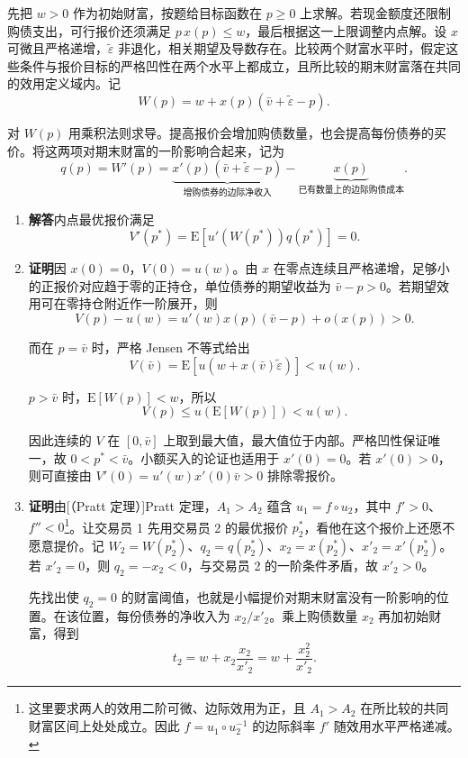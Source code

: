 \begin{solution}[blank-type=manual,blank-vsep=12\baselineskip]
先把 $w>0$ 作为初始财富，按题给目标函数在 $p\ge0$ 上求解。若现金额度还限制购债支出，可行报价还须满足 $p\,x(p)\le w$，最后根据这一上限调整内点解。设 $x$ 可微且严格递增，$\tilde\varepsilon$ 非退化，相关期望及导数存在。比较两个财富水平时，假定这些条件与报价目标的严格凹性在两个水平上都成立，且所比较的期末财富落在共同的效用定义域内。记
\[
 W(p)=w+x(p)(\bar v+\tilde\varepsilon-p).
\]

对 $W(p)$ 用乘积法则求导。提高报价会增加购债数量，也会提高每份债券的买价。将这两项对期末财富的一阶影响合起来，记为
\[
 q(p)=W'(p)
 =\underbrace{x'(p)(\bar v+\tilde\varepsilon-p)}_{\text{增购债券的边际净收入}}
 -\underbrace{x(p)}_{\text{已有数量上的边际购债成本}}.
\]

\begin{enumerate}[label=(\alph*)]
\item \textbf{解答}\quad 内点最优报价满足
\[
 V'(p^*)=\mathrm E[u'(W(p^*))q(p^*)]=0.
\]

\item \textbf{证明}\quad 因 $x(0)=0$，$V(0)=u(w)$。由 $x$ 在零点连续且严格递增，足够小的正报价对应趋于零的正持仓，单位债券的期望收益为 $\bar v-p>0$。若期望效用可在零持仓附近作一阶展开，则
\[
 V(p)-u(w)=u'(w)x(p)(\bar v-p)+o(x(p))>0.
\]

而在 $p=\bar v$ 时，严格 Jensen 不等式给出
\[
 V(\bar v)=\mathrm E[u(w+x(\bar v)\tilde\varepsilon)]<u(w).
\]

$p>\bar v$ 时，$\mathrm E[W(p)]<w$，所以
\[
 V(p)\le u(\mathrm E[W(p)])<u(w).
\]

因此连续的 $V$ 在 $[0,\bar v]$ 上取到最大值，最大值位于内部。严格凹性保证唯一，故 $0<p^*<\bar v$。小额买入的论证也适用于 $x'(0)=0$。若 $x'(0)>0$，则可直接由 $V'(0)=u'(w)x'(0)\bar v>0$ 排除零报价。

\item \textbf{证明}\quad 由\ifdefined\WJHandoutKnowledge {}[（Pratt 定理）]\else Pratt 定理\fi，$A_1>A_2$ 蕴含 $u_1=f\circ u_2$，其中 $f'>0$、$f''<0$\footnote{这里要求两人的效用二阶可微、边际效用为正，且 $A_1>A_2$ 在所比较的共同财富区间上处处成立。因此 $f=u_1\circ u_2^{-1}$ 的边际斜率 $f'$ 随效用水平严格递减。}。让交易员 1 先用交易员 2 的最优报价 $p_2^*$，看他在这个报价上还愿不愿意提价。记 $W_2=W(p_2^*)$、$q_2=q(p_2^*)$、$x_2=x(p_2^*)$、$x'_2=x'(p_2^*)$。若 $x'_2=0$，则 $q_2=-x_2<0$，与交易员 2 的一阶条件矛盾，故 $x'_2>0$。

先找出使 $q_2=0$ 的财富阈值，也就是小幅提价对期末财富没有一阶影响的位置。在该位置，每份债券的净收入为 $x_2/x'_2$。乘上购债数量 $x_2$ 再加初始财富，得到
\[
 t_2=w+x_2\frac{x_2}{x'_2}=w+\frac{x_2^2}{x'_2}.
\]


\end{enumerate}
\end{solution}
